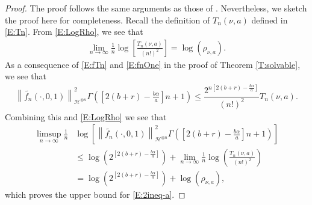 \documentclass[12pt]{report}
\theoremstyle{plain}
\theoremstyle{definition}
\numberwithin{equation}{section}
\newcommand{\Norm}[1]{\left\|  #1   \right\|}
\begin{document}
\begin{proof}
	The proof follows the same arguments as those of \cite[Lemma 4.3]{balan.chen.ea:22:exact}. Nevertheless, we sketch
	the proof here for completeness. Recall the definition of $T_n(\nu,a)$ defined in \eqref{E:Tn}.
	From \eqref{E:LogRho}, we see that
	\begin{align} \label{E:LimTn}
	\lim_{n \to \infty} \frac{1}{n} \log \left[ \frac{T_n(\nu,a)}{(n!)^2} \right]
	= \log\left(\rho_{\nu,a}\right).
	\end{align}
	As a consequence of \eqref{E:fTn} and \eqref{E:fnOne} in the proof of Theorem \ref{T:solvable}, we
	see that
	\begin{align*}
	\Norm{ \widetilde{f_n}(\cdot,0,1) }_{ \mathcal{H}^{\otimes n} }^2 \Gamma\left( \left[ 2(b+r)- \frac{b \alpha}{a} \right] n +1 \right) \le \dfrac{2^{n\left[2(b+r)-\frac{b\alpha}{a}\right]}}{(n!)^2} T_n(\nu,a).
	\end{align*}
	Combining this and \eqref{E:LogRho} we see that
	\begin{align*}
	\limsup_{n \to \infty} \frac{1}{n}
	& \log\left[ \Norm{ \widetilde{f_n}(\cdot,0,1) }_{ \mathcal{H}^{\otimes n} }^2 \Gamma\left( \left[ 2(b+r)- \frac{b \alpha}{a} \right] n +1 \right)  \right] \\
	& \le \log\left( 2^{\left[2(b+r)-\frac{b\alpha}{a}\right]} \right) + \lim_{n \to \infty} \frac{1}{n} \log\left( \frac{T_n(\nu,a)}{(n!)^2} \right)           \\
	& = \log\left(  2^{\left[2(b+r)-\frac{b\alpha}{a}\right]} \right)  + \log(\rho_{\nu,a}),
	\end{align*}
	which proves the upper bound for \eqref{E:2ineq-a}.  \bigskip
	

\end{proof}
\end{document}
